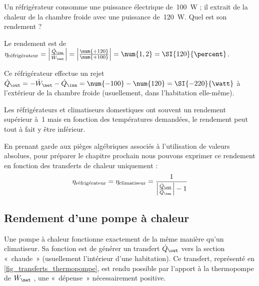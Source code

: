 		\begin{anexample}
			Un réfrigérateur consomme une puissance électrique de~\SI{100}{\watt} ; il extrait de la chaleur de la chambre froide avec une puissance de~\SI{120}{\watt}. Quel est son rendement ?
	
			\begin{answer}
				Le rendement est de $\eta_\text{réfrigérateur} = \left| \frac{\dot Q_\inn}{\dot W_\net} \right| = \left| \frac{\num{+120}}{\num{+100}} \right| = \num{1,2} = \SI{120}{\percent}$.
					\begin{remark} Ce réfrigérateur effectue un rejet $\dot Q_\out = -\dot W_\net - \dot Q_\inn = \num{-100} - \num{120}= \SI{-220}{\watt}$ à l’extérieur de la chambre froide (usuellement, dans l’habitation elle-même).\end{remark}
					\begin{remark} Les réfrigérateurs et climatiseurs domestiques ont souvent un rendement supérieur à~\num{1} mais en fonction des températures demandées, le rendement peut tout à fait y être inférieur.\end{remark}
			\end{answer}
		\end{anexample}

		En prenant garde aux pièges algébriques associés à l’utilisation de valeurs absolues, pour préparer le chapitre prochain nous pouvons exprimer ce rendement en fonction des transferts de chaleur uniquement :
		\begin{equation}
			\eta _\text{réfrigérateur} = \eta _\text{climatiseur} = \frac{1}{\left| \frac{\dot Q_\out}{\dot Q_\inn} \right| - 1}
			\label{rendement_réfrigérateur_qin_qout}
		\end{equation}





	\subsection{Rendement d’une pompe à chaleur}
	\label{ch_rendement_thermopompe}

		Une pompe à chaleur fonctionne exactement de la même manière qu’un climatiseur. Sa fonction est de générer un transfert $\dot Q_\out$ vers la section «~chaude~» (usuellement l’intérieur d’une habitation). Ce transfert, représenté en \cref{fig_transferts_thermopompe}, est rendu possible par l’apport à la thermopompe de $\dot W_\net$ , une «~dépense~» nécessairement positive.


